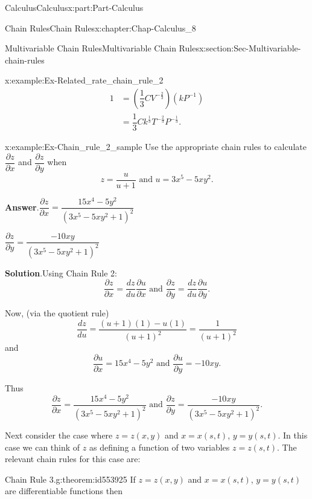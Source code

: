 \documentclass[oneside,10pt,]{book}
\newcommand{\blocktitlefont}{\relax}
\numberwithin{equation}{section}
\newcommand{\amp}{&}
\begin{document}
\begin{partptx}{Calculus}{}{Calculus}{}{}{x:part:Part-Calculus}
\begin{chapterptx}{Chain Rules}{}{Chain Rules}{}{}{x:chapter:Chap-Calculus_8}
\begin{sectionptx}{Multivariable Chain Rules}{}{Multivariable Chain Rules}{}{}{x:section:Sec-Multivariable-chain-rules}
\begin{example}{}{x:example:Ex-Related_rate_chain_rule_2}
\begin{alignat*}{1}
\amp =  \left(\dfrac{1}{3}CV^{-\frac{2}{3}}\right)(kP^{-1})\\
\amp =  \dfrac{1}{3}Ck^{\frac{1}{3}}T^{-\frac{2}{3}}P^{-\frac{1}{3}}.
\end{alignat*}
%
\end{example}
\begin{example}{}{x:example:Ex-Chain_rule_2_sample}%
Use the appropriate chain rules to calculate \(\dfrac{\partial z}{\partial x}\) and \(\dfrac{\partial z}{\partial y}\) when%
\begin{equation*}
z = \dfrac{u}{u+1} \text{ and } u = 3x^5-5xy^2.
\end{equation*}
%
\par\smallskip%
\noindent\textbf{\blocktitlefont Answer}.\hypertarget{g:answer:id553896}{}\quad{}\(\dfrac{\partial z}{\partial x} = \dfrac{15x^4-5y^2}{(3x^5-5xy^2+1)^2}\)%
\par
\(\dfrac{\partial z}{\partial y} = \dfrac{-10xy}{(3x^5-5xy^2+1)^2}\)%
\par\smallskip%
\noindent\textbf{\blocktitlefont Solution}.\hypertarget{g:solution:id553905}{}\quad{}Using Chain Rule 2:%
\begin{equation*}
\dfrac{\partial z}{\partial x} =  \dfrac{dz}{du}\dfrac{\partial u}{\partial x} \text{ and } \dfrac{\partial z}{\partial y} = \dfrac{dz}{du}\dfrac{\partial u}{\partial y}.
\end{equation*}
%
\par
Now, (via the quotient rule)%
\begin{equation*}
\dfrac{dz}{du} = \dfrac{(u+1)(1) - u(1)}{(u+1)^2} = \dfrac{1}{(u+1)^2}
\end{equation*}
and%
\begin{equation*}
\dfrac{\partial u}{\partial x} = 15x^4-5y^2 \text{ and } \dfrac{\partial u}{\partial y} = -10xy.
\end{equation*}
%
\par
Thus%
\begin{equation*}
\dfrac{\partial z}{\partial x} = \dfrac{15x^4-5y^2}{(3x^5-5xy^2+1)^2} \text{ and } \dfrac{\partial z}{\partial y} = \dfrac{-10xy}{(3x^5-5xy^2+1)^2}.
\end{equation*}
%
\end{example}
Next consider the case where \(z=z(x,y)\) and \(x=x(s,t)\), \(y=y(s,t)\). In this case we can think of \(z\) as defining a function of two variables \(z=z(s,t)\). The relevant chain rules for this case are:%
\begin{theorem}{Chain Rule 3.}{}{g:theorem:id553925}%
If \(z=z(x,y)\) and \(x=x(s,t)\), \(y=y(s,t)\) are differentiable functions then%

\end{theorem}
\end{sectionptx}
\end{chapterptx}
\end{partptx}
\end{document}
